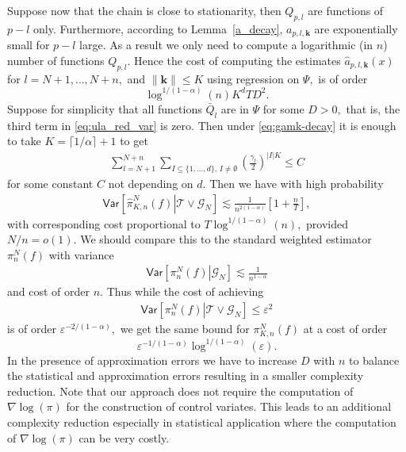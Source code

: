 \documentclass[bj]{imsart}
\def\NtrainPath{T}
\def\TrainSet{\mathcal{T}}
\begin{document}
Suppose now that the chain is close to stationarity, then \(Q_{p,l}\) are functions of \(p-l\) only.
Furthermore,  according to Lemma~\ref{a_decay}, \(a_{p,l,\mathbf{k}}\) are exponentially small for \(p-l\) large.
As a result we only need to compute a logarithmic (in \(n\)) number of functions \(Q_{p,l}.\)
Hence the cost of computing the estimates  \(\widehat {a}_{p,l,\mathbf{k}}(x)\) for \(l=N+1,\ldots,N+n,\) and \(\|\mathbf{k}\|\leq K\) using regression on \(\Psi,\) is of order
\[
\log^{1/(1-\alpha)} (n) K^d  \NtrainPath D^2.
\]
Suppose for simplicity that all functions \(\bar{Q}_l\) are in \(\Psi\) for some \(D>0,\) that is, the third term in \eqref{eq:ula_red_var} is zero.  Then under \eqref{eq:gamk-decay} it is enough to take \(K=\lceil 1/\alpha \rceil+1\) to get
\begin{eqnarray*}
\sum_{l=N+1}^{N+n}\sum_{I\subseteq\{1,\ldots,d\},\, I\neq \emptyset}
\left(\frac{\gamma_{l}}{2}\right)^{|I|K}\leq C
\end{eqnarray*}
for some constant \(C\) not depending on \(d.\) Then we have with high probability
\begin{eqnarray*}
\mathsf{Var}\left[\left.\widehat \pi_{K,n}^N(f)\right | \TrainSet \vee \mathcal{G}_N\right]\lesssim \frac{1}{n^{2(1-\alpha)}}\left[1+\frac{n}{\NtrainPath}\right],
\end{eqnarray*}
with corresponding cost proportional to \(\NtrainPath\log^{1/(1-\alpha)} (n) ,\) provided \(N/n=o(1).\) We should compare this to the standard weighted estimator \(\pi_{n}^N(f)\) with variance
\begin{eqnarray*}
\mathsf{Var}\left[\left. \pi_{n}^N(f)\right |  \mathcal{G}_N\right]\lesssim \frac{1}{n^{1-\alpha}}
\end{eqnarray*}
and cost of order \(n.\) Thus while the cost of achieving
\begin{eqnarray*}
\mathsf{Var}\left[\left. \pi_{n}^N(f)\right | \TrainSet \vee \mathcal{G}_N\right]\leq \varepsilon^2
\end{eqnarray*}
is of order  \(\varepsilon^{-2/(1-\alpha)},\) we get the same bound for \(\pi_{K,n}^N(f)\) at a cost of order
\[
\varepsilon^{-1/(1-\alpha)}\log^{1/(1-\alpha)} (\varepsilon).
\]
In the presence of approximation errors we have to increase \(D\) with \(n\) to balance  the statistical and approximation errors resulting in a smaller complexity reduction. Note that our approach does not require the computation of \(\nabla \log(\pi)\) for the construction of control variates. This leads to an additional complexity reduction especially in statistical application where the computation of \(\nabla \log(\pi)\) can be very costly.
\end{document}
